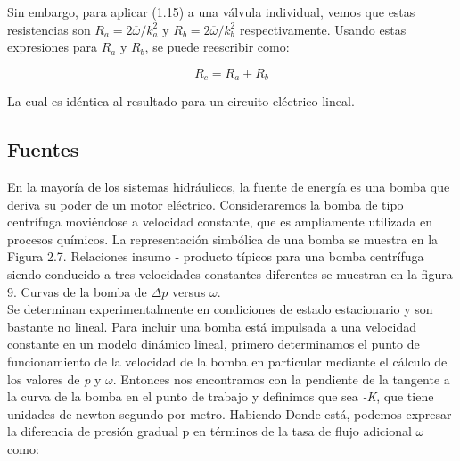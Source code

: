\documentclass[a4paper,12pt,twoside]{proyectotanquesecci}
\begin{document}
Sin embargo, para aplicar (1.15) a una válvula individual, vemos que estas resistencias son $R_{a}=2\overline{\omega}/k^{2}_{a}$ y $R_{b}=2\overline{\omega}/k^{2}_{b}$ respectivamente. Usando estas expresiones para $R_{a}$ y $R_{b}$, se puede reescribir como:

\begin{equation}
R_{c}=R_{a}+R_{b}
\end{equation}

La cual es idéntica al resultado para un circuito eléctrico lineal.

\subsection{Fuentes}

En la mayoría de los sistemas hidráulicos, la fuente de energía es una bomba que deriva su poder de un motor eléctrico. Consideraremos la bomba de tipo centrífuga moviéndose a velocidad constante, que es ampliamente utilizada en procesos químicos. La representación simbólica de una bomba se muestra en la Figura 2.7. Relaciones insumo - producto típicos para una bomba centrífuga siendo conducido a tres velocidades constantes diferentes se muestran en la figura 9. Curvas de la bomba de $\Delta p$ versus $\omega$.\\



Se determinan experimentalmente en condiciones de estado estacionario y son bastante no lineal. Para incluir una bomba está impulsada a una velocidad constante en un modelo dinámico lineal, primero determinamos el punto de funcionamiento de la velocidad de la bomba en particular mediante el cálculo de los valores de \textit{p} y $\omega$. Entonces nos encontramos con la pendiente de la tangente a la curva de la bomba en el punto de trabajo y definimos que sea \textit{-K}, que tiene unidades de newton-segundo por metro. Habiendo Donde está, podemos expresar la diferencia de presión gradual p en términos de la tasa de flujo adicional $\omega$ como: \\
\end{document}
